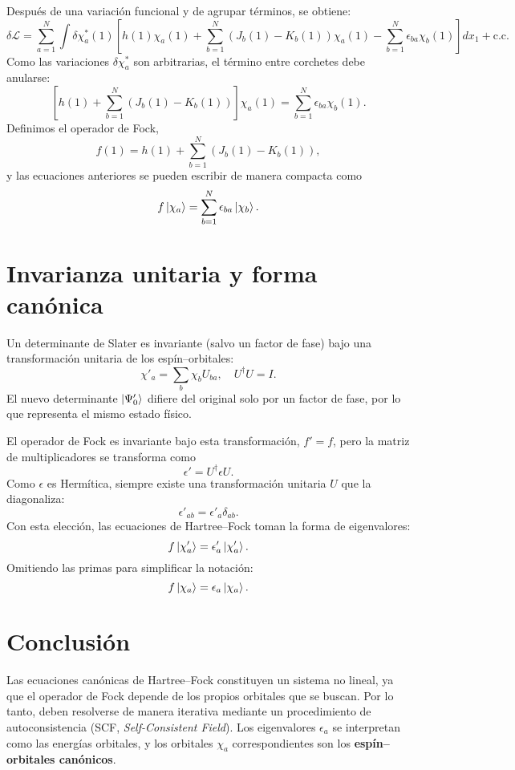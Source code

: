 \documentclass[12pt,a4paper]{article}
\begin{document}
Después de una variación funcional y de agrupar términos, se obtiene:
\[
\delta\mathcal{L} = 
\sum_{a=1}^{N} 
\int \delta\chi_a^*(1)
\left[
h(1)\chi_a(1)
+ \sum_{b=1}^{N} (J_b(1) - K_b(1))\chi_a(1)
- \sum_{b=1}^{N}\epsilon_{ba}\chi_b(1)
\right] dx_1
+ \text{c.c.}
\]
Como las variaciones \(\delta\chi_a^*\) son arbitrarias, el término entre corchetes debe anularse:
\[
\left[
h(1) + \sum_{b=1}^{N} (J_b(1) - K_b(1))
\right]\chi_a(1)
= \sum_{b=1}^{N}\epsilon_{ba}\chi_b(1).
\]
Definimos el operador de Fock,
\[
f(1) = h(1) + \sum_{b=1}^{N} (J_b(1) - K_b(1)),
\]
y las ecuaciones anteriores se pueden escribir de manera compacta como
\[
f \ket{\chi_a} = \sum_{b=1}^{N} \epsilon_{ba} \ket{\chi_b}.
\]

\section{Invarianza unitaria y forma canónica}

Un determinante de Slater es invariante (salvo un factor de fase) bajo una transformación unitaria de los espín–orbitales:
\[
\chi'_a = \sum_b \chi_b U_{ba},
\quad
U^\dagger U = I.
\]
El nuevo determinante \(\ket{\Psi'_0}\) difiere del original solo por un factor de fase, por lo que representa el mismo estado físico.

El operador de Fock es invariante bajo esta transformación, \(f' = f\), pero la matriz de multiplicadores se transforma como
\[
\epsilon' = U^\dagger \epsilon U.
\]
Como \(\epsilon\) es Hermítica, siempre existe una transformación unitaria \(U\) que la diagonaliza:
\[
\epsilon'_{ab} = \epsilon'_a \delta_{ab}.
\]
Con esta elección, las ecuaciones de Hartree–Fock toman la forma de eigenvalores:
\[
f \ket{\chi'_a} = \epsilon'_a \ket{\chi'_a}.
\]
Omitiendo las primas para simplificar la notación:
\[
f \ket{\chi_a} = \epsilon_a \ket{\chi_a}.
\]

\section{Conclusión}

Las ecuaciones canónicas de Hartree--Fock constituyen un sistema no lineal, ya que el operador de Fock depende de los propios orbitales que se buscan.  
Por lo tanto, deben resolverse de manera iterativa mediante un procedimiento de autoconsistencia (SCF, \textit{Self-Consistent Field}).  
Los eigenvalores \(\epsilon_a\) se interpretan como las energías orbitales, y los orbitales \(\chi_a\) correspondientes son los \textbf{espín–orbitales canónicos}.
\end{document}
